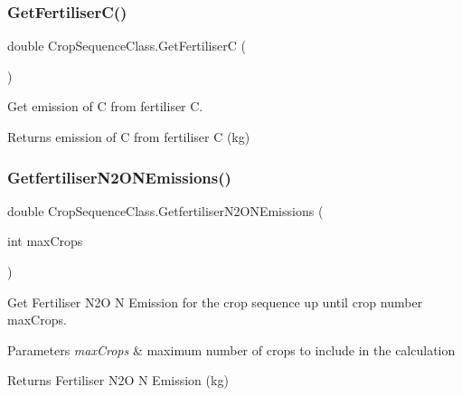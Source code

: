 \subsubsection{\texorpdfstring{GetFertiliserC()}{GetFertiliserC()}}
{\footnotesize\ttfamily double Crop\+Sequence\+Class.\+Get\+FertiliserC (\begin{DoxyParamCaption}{ }\end{DoxyParamCaption})\hspace{0.3cm}{\ttfamily [inline]}}



Get emission of C from fertiliser C. 

\begin{DoxyReturn}{Returns}
emission of C from fertiliser C (kg) 
\end{DoxyReturn}
\mbox{\label{class_crop_sequence_class_a25ec8b736a7caa75da1edcac08360cd7}} 
\subsubsection{\texorpdfstring{GetfertiliserN2ONEmissions()}{GetfertiliserN2ONEmissions()}}
{\footnotesize\ttfamily double Crop\+Sequence\+Class.\+Getfertiliser\+N2\+O\+N\+Emissions (\begin{DoxyParamCaption}\item[{int}]{max\+Crops }\end{DoxyParamCaption})\hspace{0.3cm}{\ttfamily [inline]}}



Get Fertiliser N2O N Emission for the crop sequence up until crop number max\+Crops. 


\begin{DoxyParams}{Parameters}
{\em max\+Crops} & maximum number of crops to include in the calculation \\
\hline
\end{DoxyParams}
\begin{DoxyReturn}{Returns}
Fertiliser N2O N Emission (kg) 
\end{DoxyReturn}
\mbox{\label{class_crop_sequence_class_addf101545276712d2d93c28e298d36ae}} 
